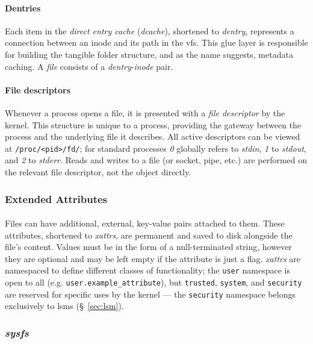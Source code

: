 \paragraph{Dentries} Each item in the \textit{direct entry cache} (\textit{dcache}), shortened to \textit{dentry}, represents a connection between an inode and its path in the \acrshort{vfs}. This glue layer is responsible for building the tangible folder structure, and as the name suggests, metadata caching. A \textit{file} consists of a \textit{dentry}-\textit{inode} pair.

\paragraph{File descriptors} Whenever a process opens a file, it is presented with a \textit{file descriptor} by the kernel. This structure is unique to a process, providing the gateway between the process and the underlying file it describes. All active descriptors can be viewed at \texttt{/proc/<pid>/fd/}; for standard processes \textit{0} globally refers to \textit{stdin}, \textit{1} to \textit{stdout}, and \textit{2} to \textit{stderr}. Reads and writes to a file (or socket, pipe, etc.) are performed on the relevant file descriptor, not the object directly.

\subsubsection{Extended Attributes} 

\paragraph{} Files can have additional, external, key-value pairs attached to them. These attributes, shortened to \textit{\acrshort{xattr}s}, are permanent and saved to disk alongside the file's content. Values must be in the form of a null-terminated string, however they are optional and may be left empty if the attribute is just a flag. \textit{\acrshort{xattr}s} are namespaced to define different classes of functionality; the \texttt{user} namespace is open to all (e.g. \texttt{user.example\_attribute}), but \texttt{trusted}, \texttt{system}, and \texttt{security} are reserved for specific uses by the kernel --- the \texttt{security} namespace belongs exclusively to \acrshort{lsm}s (§~\ref{sec:lsm}).

\subsubsection{\textit{sysfs}}
